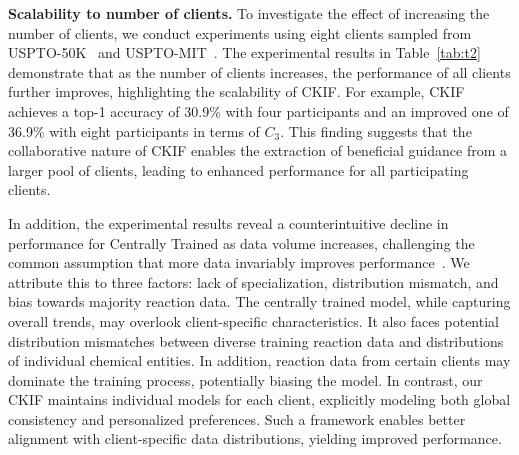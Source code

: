 \noindent\textbf{Scalability to number of clients.}
To investigate the effect of increasing the number of clients, we conduct experiments using eight clients sampled from USPTO-50K~\citep{schneider2016s} and USPTO-MIT~\citep{jin2017predicting}. The experimental results in Table~\ref{tab:t2} demonstrate that as the number of clients increases, the performance of all clients further improves, highlighting the scalability of CKIF. For example, CKIF achieves a top-1 accuracy of 30.9\% with four participants and an improved one of 36.9\% with eight participants in terms of $C_3$. This finding suggests that the collaborative nature of CKIF enables the extraction of beneficial guidance from a larger pool of clients, leading to enhanced performance for all participating clients.


In addition, the experimental results reveal a counterintuitive decline in performance for Centrally Trained as data volume increases, challenging the common assumption that more data invariably improves performance~\citep{edunov2018understanding,sugiyama2019data}. We attribute this to three factors: lack of specialization, distribution mismatch, and bias towards majority reaction data. The centrally trained model, while capturing overall trends, may overlook client-specific characteristics. It also faces potential distribution mismatches between diverse training reaction data and distributions of individual chemical entities. In addition, reaction data from certain clients may dominate the training process, potentially biasing the model. In contrast, our CKIF maintains individual models for each client, explicitly modeling both global consistency and personalized preferences. Such a framework enables better alignment with client-specific data distributions, yielding improved performance.








